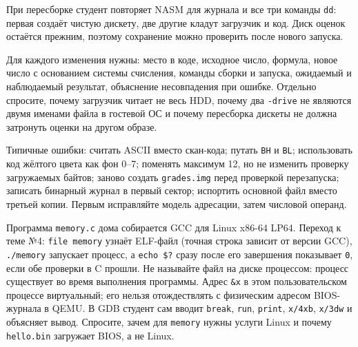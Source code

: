 При пересборке студент повторяет NASM для журнала и все три команды
\texttt{dd}: первая создаёт чистую дискету, две другие кладут загрузчик
и код. Диск оценок остаётся прежним, поэтому сохранение можно проверить
после нового запуска.

Для каждого изменения нужны: место в коде, исходное число, формула,
новое число с основанием системы счисления, команды сборки и запуска,
ожидаемый и наблюдаемый результат, объяснение несовпадения при ошибке.
Отдельно спросите, почему загрузчик читает не весь HDD, почему два
\texttt{-drive} не являются двумя именами файла в гостевой ОС и почему
пересборка дискеты не должна затронуть оценки на другом образе.

Типичные ошибки: считать ASCII вместо скан-кода; путать \texttt{BH} и
\texttt{BL}; использовать код жёлтого цвета как фон 0--7; поменять
максимум 12, но не изменить проверку загружаемых байтов; заново создать
\texttt{grades.img} перед проверкой перезапуска; записать бинарный
журнал в первый сектор; испортить основной файл вместо третьей копии.
Первым исправляйте модель адресации, затем числовой операнд.

Программа \texttt{memory.c} дома собирается GCC для Linux x86-64 LP64.
Переход к теме №4: \texttt{file\ memory} узнаёт ELF-файл (точная строка
зависит от версии GCC), \texttt{./memory} запускает процесс, а
\texttt{echo\ \$?} сразу после его завершения показывает \texttt{0},
если обе проверки в C прошли. Не называйте файл на диске процессом:
процесс существует во время выполнения программы. Адрес \texttt{\&x} в
этом пользовательском процессе виртуальный; его нельзя отождествлять с
физическим адресом BIOS-журнала в QEMU. В GDB студент сам вводит
\texttt{break}, \texttt{run}, \texttt{print}, \texttt{x/4xb},
\texttt{x/3dw} и объясняет вывод. Спросите, зачем для \texttt{memory}
нужны услуги Linux и почему \texttt{hello.bin} загружает BIOS, а не
Linux.
